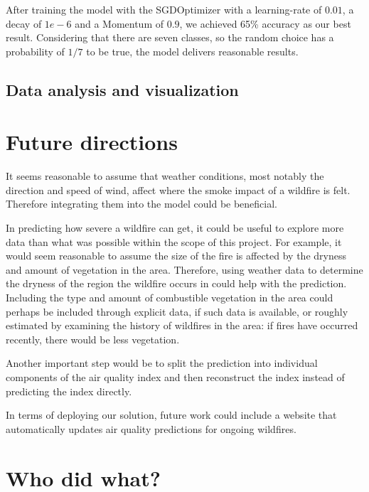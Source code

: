 \documentclass[a4paper,12pt]{article}
\begin{document}
After training the model with the SGDOptimizer with a learning-rate of $0.01$, a decay of $1e-6$ and a Momentum of $0.9$, we achieved 65\% accuracy as our best result.
Considering that there are seven classes, so the random choice has a probability of $1/7$ to be true, the model delivers reasonable results.

\subsection{Data analysis and visualization}

\section{Future directions}

It seems reasonable to assume that weather conditions, most notably the direction and speed of wind, affect where the smoke impact of a wildfire is felt. Therefore integrating them into the model could be beneficial.

In predicting how severe a wildfire can get, it could be useful to explore more data than what was possible within the scope of this project. For example, it would seem reasonable to assume the size of the fire is affected by the dryness and amount of vegetation in the area. Therefore, using weather data to determine the dryness of the region the wildfire occurs in could help with the prediction. Including the type and amount of combustible vegetation in the area could perhaps be included through explicit data, if such data is available, or roughly estimated by examining the history of wildfires in the area: if fires have occurred recently, there would be less vegetation.

Another important step would be to split the prediction into individual components of the air quality index and then reconstruct the index instead of predicting the index directly.

In terms of deploying our solution, future work could include a website that automatically updates air quality predictions for ongoing wildfires.

\section{Who did what?}

\nocite{*}
\printbibliography[title={Bibliography},heading=bibliography]
\end{document}
